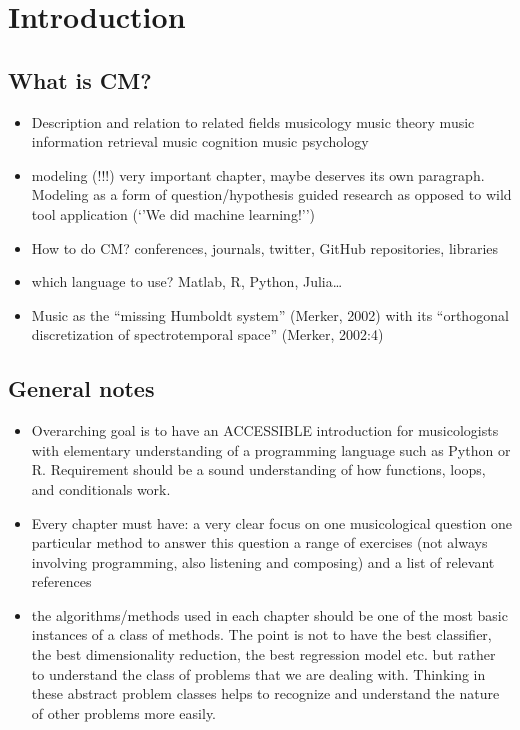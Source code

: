 \documentclass[letterpaper,10pt,english]{sphinxmanual}
\begin{document}
\chapter{Introduction}
\label{\detokenize{0_intro:introduction}}\label{\detokenize{0_intro::doc}}

\section{What is CM?}
\label{\detokenize{0_intro:what-is-cm}}\begin{itemize}
\item {} 
Description and relation to related fields
\textendash{} musicology
\textendash{} music theory
\textendash{} music information retrieval
\textendash{} music cognition
\textendash{} music psychology

\item {} 
modeling (!!!) very important chapter, maybe deserves its own paragraph. Modeling as a form of question/hypothesis guided research as opposed to wild tool application (‘’We did machine learning!’’)

\item {} 
How to do CM? conferences, journals, twitter, GitHub repositories, libraries

\item {} 
which language to use? Matlab, R, Python, Julia…

\item {} 
Music as the “missing Humboldt system” (Merker, 2002) with its “orthogonal discretization of spectro\sphinxhyphen{}temporal space” (Merker, 2002:4)

\end{itemize}


\section{General notes}
\label{\detokenize{0_intro:general-notes}}\begin{itemize}
\item {} 
Overarching goal is to have an ACCESSIBLE introduction for musicologists with elementary understanding of a programming language such as Python or R. Requirement should be a sound understanding of how functions, loops, and conditionals work.

\item {} 
Every chapter must have:
\textendash{} a very clear focus on one musicological question
\textendash{} one particular method to answer this question
\textendash{} a range of exercises (not always involving programming, also listening and composing)
\textendash{} and a list of relevant references

\item {} 
the algorithms/methods used in each chapter should be one of the most basic instances of a class of methods. The point is not to have the best classifier, the best dimensionality reduction, the best regression model etc. but rather to understand the class of problems that we are dealing with. Thinking in these abstract problem classes helps to recognize and understand the nature of other problems more easily.

\end{itemize}
\end{document}
